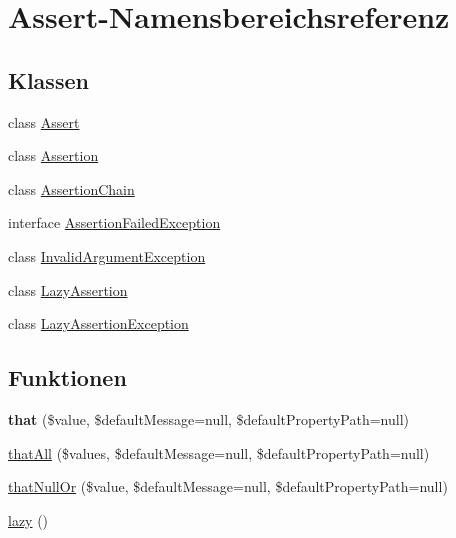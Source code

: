 \hypertarget{namespace_assert}{}\section{Assert-\/\+Namensbereichsreferenz}
\label{namespace_assert}
\subsection*{Klassen}
\begin{DoxyCompactItemize}
\item 
class \mbox{\hyperlink{class_assert_1_1_assert}{Assert}}
\item 
class \mbox{\hyperlink{class_assert_1_1_assertion}{Assertion}}
\item 
class \mbox{\hyperlink{class_assert_1_1_assertion_chain}{Assertion\+Chain}}
\item 
interface \mbox{\hyperlink{interface_assert_1_1_assertion_failed_exception}{Assertion\+Failed\+Exception}}
\item 
class \mbox{\hyperlink{class_assert_1_1_invalid_argument_exception}{Invalid\+Argument\+Exception}}
\item 
class \mbox{\hyperlink{class_assert_1_1_lazy_assertion}{Lazy\+Assertion}}
\item 
class \mbox{\hyperlink{class_assert_1_1_lazy_assertion_exception}{Lazy\+Assertion\+Exception}}
\end{DoxyCompactItemize}
\subsection*{Funktionen}
\begin{DoxyCompactItemize}
\item 
\mbox{\label{namespace_assert_a9f799d4c3164256a91a606990538a24c}} 
{\bfseries that} (\$value, \$default\+Message=null, \$default\+Property\+Path=null)
\item 
\mbox{\hyperlink{namespace_assert_a378b25b5d71c403bdc11d30eac5af701}{that\+All}} (\$values, \$default\+Message=null, \$default\+Property\+Path=null)
\item 
\mbox{\hyperlink{namespace_assert_af03f4db4476f5f158ed16b6e0bfce05f}{that\+Null\+Or}} (\$value, \$default\+Message=null, \$default\+Property\+Path=null)
\item 
\mbox{\hyperlink{namespace_assert_a46e40540c897ee751f88a5a37a38dd4d}{lazy}} ()
\end{DoxyCompactItemize}



